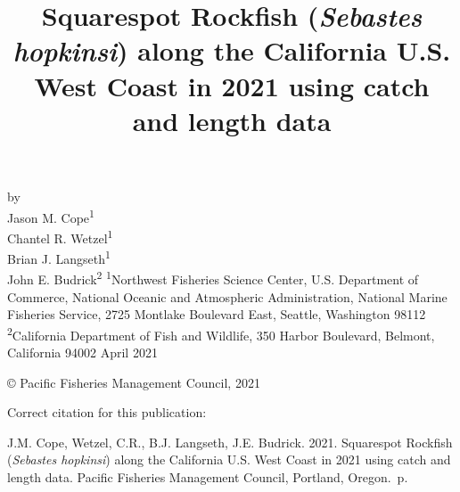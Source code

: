 \documentclass[11pt,
  english,
  a4paper,
]{article}
\date{}
\newcommand{\trTitle}{Squarespot Rockfish (\emph{Sebastes hopkinsi}) along the California U.S. West Coast in 2021 using catch and length data}
\newcommand{\trYear}{2021}
\newcommand{\trMonth}{April}
\newcommand{\trAuthsBack}{J.M. Cope, Wetzel, C.R., B.J. Langseth, J.E. Budrick}
\newcommand{\trCitation}{
\begin{hangparas}{1em}{1}
\trAuthsBack{}. \trYear{}. \trTitle{}. Pacific Fisheries Management Council, Portland, Oregon. \pageref{LastPage}{}\,p.
\end{hangparas}}
\begin{document}

\renewcommand*{\thefootnote}{\fnsymbol{footnote}}

\small
\thispagestyle{empty}
\noindent
\begin{center}
\title{Squarespot Rockfish (\emph{Sebastes hopkinsi}) along the California U.S. West Coast in 2021 using catch and length data}
\vspace{1.5cm}
{\Large\textbf{}}
\vfill
by\\
Jason M. Cope\textsuperscript{1}\\
Chantel R. Wetzel\textsuperscript{1}\\
Brian J. Langseth\textsuperscript{1}\\
John E. Budrick\textsuperscript{2}\vfill
\textsuperscript{1}Northwest Fisheries Science Center, U.S. Department of Commerce, National Oceanic and Atmospheric Administration, National Marine Fisheries Service, 2725 Montlake Boulevard East, Seattle, Washington 98112\\
\textsuperscript{2}California Department of Fish and Wildlife, 350 Harbor Boulevard, Belmont, California 94002\vfill
\trMonth{} \trYear{}
\end{center}
\clearpage

\thispagestyle{empty}
\vspace*{\fill}
\begin{center}
\copyright{} Pacific Fisheries Management Council, \trYear{}\\
\end{center}
\par
\bigskip
\noindent
Correct citation for this publication:
\bigskip
\par
\trCitation{}
\clearpage


\tableofcontents\clearpage
\label{TRlastRoman}
\clearpage

\newpage
\thispagestyle{empty} %

\pagestyle{plain}  %
\renewcommand*{\thefootnote}{\arabic{footnote}}  %
\setcounter{footnote}{0}  %
\renewcommand{\headrulewidth}{0.5pt}
\renewcommand{\footrulewidth}{0.5pt}
\end{document}
